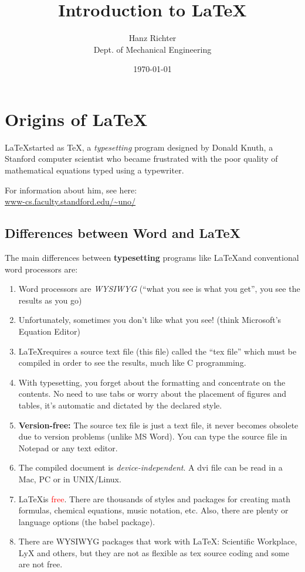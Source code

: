 \documentclass[10pt,twocolumn,letterpaper]{article} %
\author{Hanz Richter \\ Dept. of Mechanical Engineering} %
\date{\today} %
\title{Introduction to \LaTeX} %
\begin{document}
\maketitle
\tableofcontents
\listoffigures
\listoftables
\section{Origins of \LaTeX}
\LaTeX started as \TeX, a \emph{typesetting} %
program designed by Donald Knuth, a Stanford computer scientist who became frustrated with the poor quality of mathematical equations typed using a typewriter. %

\noindent For information about him, see here:\\ %
\url{www-cs.faculty.standford.edu/~uno/}\\ %
\subsection{Differences between Word and \LaTeX}\label{ssdiff} %
The main differences between \textbf{typesetting} programs like \LaTeX and conventional word processors are:
\begin{enumerate}
\item Word processors are \emph{WYSIWYG} (``what you see is what you get'', you see the results as you go)
\item Unfortunately, sometimes you don't like what you see! (think Microsoft's Equation Editor)
\item \LaTeX requires a source text file (this file) called the ``tex file'' which must be compiled in order to see the results, much like C programming.
\item With typesetting, you forget about the formatting and concentrate on the contents. No need to use tabs or worry about the placement of figures and tables, it's automatic and dictated by the declared style.
\item \textbf{Version-free:} The source tex file is just a text file, it never becomes obsolete due to version problems (unlike MS Word). You can type the source file in Notepad or any text editor.
\item The compiled document is \emph{device-independent}. A dvi file can be read in a Mac, PC or in UNIX/Linux.
\item \LaTeX is \textcolor{red}{free}. There are thousands of styles and packages for creating math formulas, chemical equations, music notation, etc. Also, there are plenty or language options (the babel package).
\item There are WYSIWYG packages that work with \LaTeX: Scientific Workplace, LyX and others, but they are not as flexible as tex source coding and some are not free.
\end{enumerate}
\end{document}
